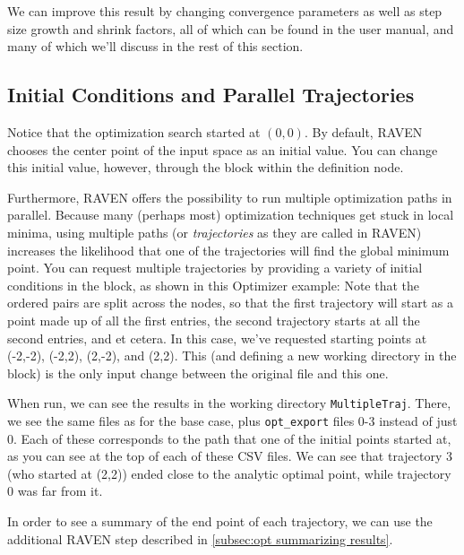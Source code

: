 We can improve this result by changing convergence
parameters as well as step size growth and shrink factors, all of which can be found in the user manual, and
many of which we'll discuss in the rest of this section.

\subsection{Initial Conditions and Parallel Trajectories} \label{subsec:opt parallel traj}
Notice that the optimization search started at $(0,0)$.  By default, RAVEN chooses the center
point of the input space as an initial value.  You can change this initial value, however, through
the  block within the  definition node.

Furthermore, RAVEN offers the possibility to run multiple optimization paths in parallel.  Because many
(perhaps most) optimization techniques get stuck in local minima, using multiple paths (or \emph{trajectories} as
they are called in RAVEN) increases the likelihood that one of the trajectories will find the global minimum
point.  You can request multiple trajectories by providing a variety of initial conditions in the
 block, as shown in this Optimizer example:
Note that the ordered pairs are split across the  nodes, so that the first trajectory will
start as a point made up of all the first entries, the second trajectory starts at all the second entries, and
et cetera.  In this case, we've requested starting points at (-2,-2), (-2,2), (2,-2), and (2,2).  This (and
defining a new working directory in the  block) is the only input change between the original
file and this one.

When run, we can see the results in the working directory \texttt{MultipleTraj}.  There, we see the same files
as for the base case, plus \texttt{opt\_export} files 0-3 instead of just 0.  Each of these corresponds to the
path that one of the initial points started at, as you can see at the top of each of these CSV files.  We can
see that trajectory 3 (who started at (2,2)) ended close to the analytic optimal point, while trajectory 0
was far from it.

In order to see a summary of the end point of each trajectory, we can use the additional RAVEN step described
in \ref{subsec:opt summarizing results}.


